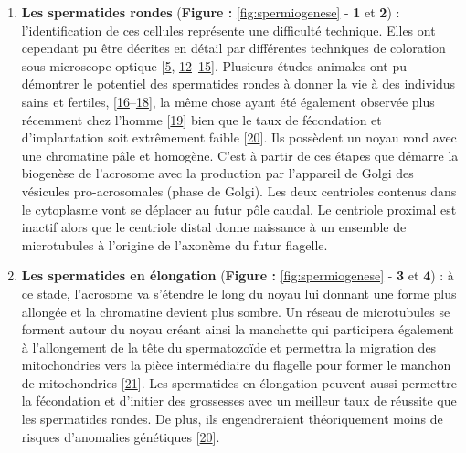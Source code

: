 \documentclass[12pt,twoside]{ugathesis}
\theoremstyle{definition}
\theoremstyle{definition}
\theoremstyle{remark}
\begin{document}
\begin{enumerate}
\def\labelenumi{\arabic{enumi}.}
\item
  \textbf{Les spermatides rondes} (\textbf{Figure :
  }\ref{fig:spermiogenese} - \textbf{1} et \textbf{2}) :
  l'identification de ces cellules représente une difficulté technique.
  Elles ont cependant pu être décrites en détail par différentes
  techniques de coloration sous microscope optique
  {[}\protect\hyperlink{ref-Clermont1963}{5},
  \protect\hyperlink{ref-Papic}{12}--\protect\hyperlink{ref-WorldHealthOrganization1992}{15}{]}.
  Plusieurs études animales ont pu démontrer le potentiel des
  spermatides rondes à donner la vie à des individus sains et fertiles,
  {[}\protect\hyperlink{ref-Ogura1994}{16}--\protect\hyperlink{ref-Sasagawa}{18}{]},
  la même chose ayant été également observée plus récemment chez l'homme
  {[}\protect\hyperlink{ref-Tanaka2015}{19}{]} bien que le taux de
  fécondation et d'implantation soit extrêmement faible
  {[}\protect\hyperlink{ref-Asimakopoulos2003}{20}{]}. Ils possèdent un
  noyau rond avec une chromatine pâle et homogène. C'est à partir de ces
  étapes que démarre la biogenèse de l'acrosome avec la production par
  l'appareil de Golgi des vésicules pro-acrosomales (phase de Golgi).
  Les deux centrioles contenus dans le cytoplasme vont se déplacer au
  futur pôle caudal. Le centriole proximal est inactif alors que le
  centriole distal donne naissance à un ensemble de microtubules à
  l'origine de l'axonème du futur flagelle.
\item
  \textbf{Les spermatides en élongation} (\textbf{Figure :
  }\ref{fig:spermiogenese} - \textbf{3} et \textbf{4}) : à ce stade,
  l'acrosome va s'étendre le long du noyau lui donnant une forme plus
  allongée et la chromatine devient plus sombre. Un réseau de
  microtubules se forment autour du noyau créant ainsi la manchette qui
  participera également à l'allongement de la tête du spermatozoïde et
  permettra la migration des mitochondries vers la pièce intermédiaire
  du flagelle pour former le manchon de mitochondries
  {[}\protect\hyperlink{ref-Moreno2006}{21}{]}. Les spermatides en
  élongation peuvent aussi permettre la fécondation et d'initier des
  grossesses avec un meilleur taux de réussite que les spermatides
  rondes. De plus, ils engendreraient théoriquement moins de risques
  d'anomalies génétiques
  {[}\protect\hyperlink{ref-Asimakopoulos2003}{20}{]}.
\end{enumerate}

\newpage
\end{document}
